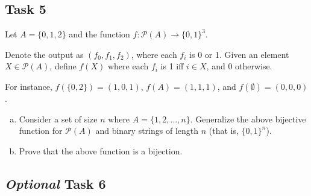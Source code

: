 \documentclass[12pt,letterpaper]{article}
\begin{document}
\subsection*{Task 5}

Let $A=\{0,1,2\}$ and the function $f:{\mathcal P}(A)\rightarrow \{0,1\}^3$.

Denote the output as $(f_0, f_1, f_2)$, where each $f_i$ is 0 or 1. Given an element $X \in \mathcal{P}(A)$, define $f(X)$ where each $f_i$ is 1 iff $i\in X$, and 0 otherwise.
 
 For instance, $f(\{0, 2\}) = (1, 0, 1)$, $f(A) = (1, 1, 1)$, and $f(\emptyset) = (0, 0, 0)$.
 
 \begin{enumerate}[a.]
     \item Consider a set of size $n$ where $A=\{1,2,\ldots, n\}$. Generalize the above bijective function for ${\mathcal P}(A)$ and binary strings of length $n$ (that is, $\{0,1\}^n$).
     
     \begin{mdframed} \vspace{2cm} \end{mdframed}
     
     \item Prove that the above function is a bijection.
     \begin{mdframed} \vspace{8cm} \end{mdframed}
 \end{enumerate}

\subsection*{\textit{Optional} Task 6}
      
\end{document}
